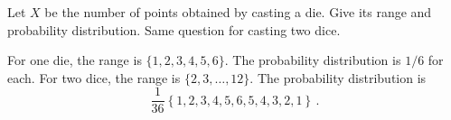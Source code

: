 

Let $X$ be the number of points obtained by casting a die.
Give its range and probability distribution.
Same question for casting two dice.


For one die, the range is $\{1, 2, 3, 4, 5, 6\}$.
The probability distribution is $1/6$ for each.
For two dice, the range is $\{2, 3, \ldots , 12\}$.
The probability distribution is
\begin{equation*}
\frac{1}{36} \left\{ 1, 2, 3, 4, 5, 6, 5, 4, 3, 2, 1 \right\} \, .
\end{equation*}
